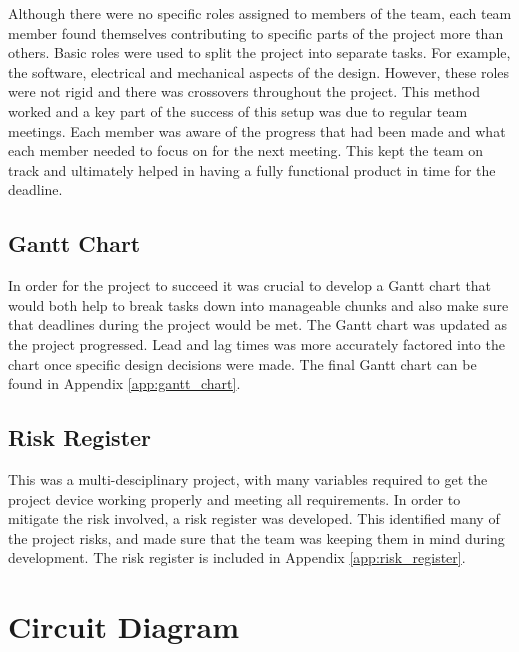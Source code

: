 \documentclass[a4paper,12pt]{article}
\begin{document}
Although there were no specific roles assigned to members of the team, each team member found themselves contributing to specific parts of the project more than others. Basic roles were used to split the project into separate tasks. For example, the software, electrical and mechanical aspects of the design. However, these roles were not rigid and there was crossovers throughout the project. This method worked and a key part of the success of this setup was due to regular team meetings. Each member was aware of the progress that had been made and what each member needed to focus on for the next meeting. This kept the team on track and ultimately helped in having a fully functional product in time for the deadline.

\subsection{Gantt Chart}
\label{sec:gantt_chart}

In order for the project to succeed it was crucial to develop a Gantt chart that would both help to break tasks down into manageable chunks and also make sure that deadlines during the project would be met. The Gantt chart was updated as the project progressed. Lead and lag times was more accurately factored into the chart once specific design decisions were made. The final Gantt chart can be found in Appendix \ref{app:gantt_chart}.

\subsection{Risk Register}
\label{sec:risk_register}

This was a multi-desciplinary project, with many variables required to get the project device working properly and meeting all requirements. In order to mitigate the risk involved, a risk register was developed. This identified many of the project risks, and made sure that the team was keeping them in mind during development. The risk register is included in Appendix \ref{app:risk_register}.



\appendix

\section{Circuit Diagram}
\label{app:circuit_diagram}
\end{document}
